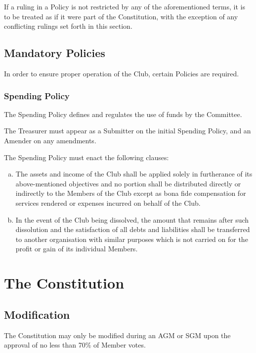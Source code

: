 \documentclass[a4paper,12pt]{article}
\begin{document}
If a ruling in a Policy is not restricted by any of the aforementioned terms, it is to be treated as if it were part of the Constitution, with the exception of any conflicting rulings set forth in this section.

\subsection{Mandatory Policies}

In order to ensure proper operation of the Club, certain Policies are required.

\subsubsection{Spending Policy}

The Spending Policy defines and regulates the use of funds by the Committee.

The Treasurer must appear as a Submitter on the initial Spending Policy, and an Amender on any amendments.

The Spending Policy must enact the following clauses:
\begin{enumerate}[a)]
	\item The assets and income of the Club shall be applied solely in furtherance of its above-mentioned objectives and no portion shall be distributed directly or indirectly to the Members of the Club except as bona fide compensation for services rendered or expenses incurred on behalf of the Club.
	\item In the event of the Club being dissolved, the amount that remains after such dissolution and the satisfaction of all debts and liabilities shall be transferred to another organisation with similar purposes which is not carried on for the profit or gain of its individual Members.
\end{enumerate}

\section{The Constitution}

\subsection{Modification}

The Constitution may only be modified during an AGM or SGM upon the approval of no less than 70\% of Member votes.
\end{document}
